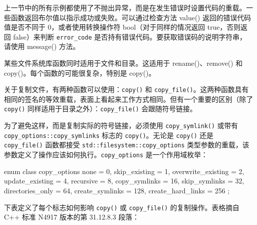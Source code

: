 上一节中的所有示例都使用了不抛出异常，而是在发生错误时设置代码的重载。一些函数返回布尔值以指示成功或失败。可以通过检查方法 value() 返回的错误代码值是否不同于 0，或者使用转换操作符 bool（对于同样的情况返回 true，否则返回 false）来判断 \verb|error_code| 是否持有错误代码。要获取错误码的说明字符串，请使用 message() 方法。

某些文件系统库函数同时适用于文件和目录。这适用于 rename()、remove() 和 copy()。每个函数的可能很复杂，特别是 copy()。

关于复制文件，有两种函数可以使用：\verb|copy()| 和 \verb|copy_file()|。这两种函数具有相同的签名的等效重载，表面上看起来工作方式相同。但有一个重要的区别（除了 \verb|copy()| 同样适用于目录之外）：\verb|copy_file()| 会跟随符号链接。

为了避免这样，而是复制实际的符号链接，必须使用 \verb|copy_symlink()| 或带有 \verb|copy_options::copy_symlinks| 标志的 \verb|copy()|。无论是 \verb|copy()| 还是 \verb|copy_file()| 函数都接受 \verb|std::filesystem::copy_options| 类型参数的重载，该参数定义了操作应该如何执行。\verb|copy_options| 是一个作用域枚举：

\begin{cpp}
enum class copy_options
{
    none               = 0,
    skip_existing      = 1,
    overwrite_existing = 2,
    update_existing    = 4,
    recursive          = 8,
    copy_symlinks      = 16,
    skip_symlinks      = 32,
    directories_only   = 64,
    create_symlinks    = 128,
    create_hard_links  = 256
};
\end{cpp}

下表定义了每个标志如何影响 \verb|copy()| 或 \verb|copy_file()| 的复制操作。表格摘自 C++ 标准 N4917 版本的第 31.12.8.3 段落：

